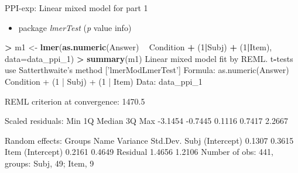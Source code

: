 \documentclass[ignorenonframetext,]{beamer}
\newenvironment{Shaded}{\begin{snugshade}}{\end{snugshade}}
\newcommand{\KeywordTok}[1]{\textcolor[rgb]{0.13,0.29,0.53}{\textbf{#1}}}
\newcommand{\DataTypeTok}[1]{\textcolor[rgb]{0.13,0.29,0.53}{#1}}
\newcommand{\DecValTok}[1]{\textcolor[rgb]{0.00,0.00,0.81}{#1}}
\newcommand{\StringTok}[1]{\textcolor[rgb]{0.31,0.60,0.02}{#1}}
\newcommand{\OperatorTok}[1]{\textcolor[rgb]{0.81,0.36,0.00}{\textbf{#1}}}
\newcommand{\NormalTok}[1]{#1}
\providecommand{\tightlist}{%
  \setlength{\itemsep}{0pt}\setlength{\parskip}{0pt}}
\begin{document}
\begin{frame}[fragile]{PPI-exp: Linear mixed model for part 1}

\begin{itemize}
\tightlist
\item
  package \emph{lmerTest} (\emph{p} value info)
\end{itemize}

\tiny

\begin{Shaded}
\begin{Highlighting}[]
\OperatorTok{>}\StringTok{ }\NormalTok{m1 <-}\StringTok{ }\KeywordTok{lmer}\NormalTok{(}\KeywordTok{as.numeric}\NormalTok{(Answer) }\OperatorTok{~}\StringTok{ }\NormalTok{Condition }\OperatorTok{+}\StringTok{ }\NormalTok{(}\DecValTok{1}\OperatorTok{|}\NormalTok{Subj) }\OperatorTok{+}\StringTok{ }\NormalTok{(}\DecValTok{1}\OperatorTok{|}\NormalTok{Item), }\DataTypeTok{data=}\NormalTok{data_ppi_}\DecValTok{1}\NormalTok{)}
\OperatorTok{>}\StringTok{ }\KeywordTok{summary}\NormalTok{(m1)}
\NormalTok{Linear mixed model fit by REML. t}\OperatorTok{-}\NormalTok{tests use Satterthwaite}\StringTok{'s method ['}\NormalTok{lmerModLmerTest}\StringTok{']}
\StringTok{Formula: as.numeric(Answer) ~ Condition + (1 | Subj) + (1 | Item)}
\StringTok{   Data: data_ppi_1}

\StringTok{REML criterion at convergence: 1470.5}

\StringTok{Scaled residuals: }
\StringTok{    Min      1Q  Median      3Q     Max }
\StringTok{-3.1454 -0.7445  0.1116  0.7417  2.2667 }

\StringTok{Random effects:}
\StringTok{ Groups   Name        Variance Std.Dev.}
\StringTok{ Subj     (Intercept) 0.1307   0.3615  }
\StringTok{ Item     (Intercept) 0.2161   0.4649  }
\StringTok{ Residual             1.4656   1.2106  }
\StringTok{Number of obs: 441, groups:  Subj, 49; Item, 9}
\end{Highlighting}
\end{Shaded}

\end{frame}
\end{document}
